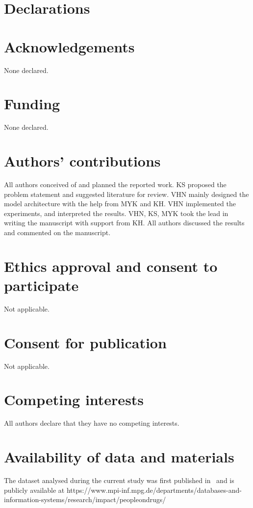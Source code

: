 \documentclass{bmcart}
\begin{document}
\section*{Declarations}
\begin{backmatter}

\section*{Acknowledgements}
None declared.

\section*{Funding}
None declared.

\section*{Authors’ contributions}
All authors conceived of and planned the reported work. KS proposed the problem statement and suggested literature for review. VHN mainly designed the model architecture with the help from MYK and KH. VHN implemented the experiments, and interpreted the results. VHN, KS, MYK took the lead in writing the manuscript with support from KH. All authors discussed the results and commented on the manuscript.

\section*{Ethics approval and consent to participate}
Not applicable.

\section*{Consent for publication}
Not applicable.

\section*{Competing interests}
  All authors declare that they have no competing interests.
  
\section*{Availability of data and materials}
The dataset analysed during the current study was first published in~\cite{mukherjee2014people} and is publicly available at https://www.mpi-inf.mpg.de/departments/databases-and-information-systems/research/impact/peopleondrugs/


\end{backmatter}
\end{document}
